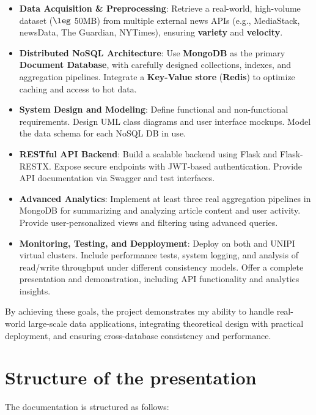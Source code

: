 \begin{itemize}
    \item \textbf{Data Acquisition \& Preprocessing}: Retrieve a real-world, high-volume dataset ($\leg$ 50MB) from multiple external news APIs (e.g., MediaStack, newsData, The Guardian, NYTimes), ensuring \textbf{variety} and \textbf{velocity}.
    \item \textbf{Distributed NoSQL Architecture}: Use \textbf{MongoDB} as the primary \textbf{Document Database}, with carefully designed collections, indexes, and aggregation pipelines.
    Integrate a \textbf{Key-Value store} (\textbf{Redis}) to optimize caching and access to hot data.
    \item \textbf{System Design and Modeling}: Define functional and non-functional requirements.
    Design UML class diagrams and user interface mockups.
    Model the data schema for each NoSQL DB in use.
    \item \textbf{RESTful API Backend}: Build a scalable backend using Flask and Flask-RESTX.
    Expose secure endpoints with JWT-based authentication.
    Provide API documentation via Swagger and test interfaces.
    \item \textbf{Advanced Analytics}: Implement at least three real aggregation pipelines in MongoDB for summarizing and analyzing article content and user activity.
    Provide user-personalized views and filtering using advanced queries.
    \item \textbf{Monitoring, Testing, and Depployment}: Deploy on both and UNIPI virtual clusters.
    Include performance tests, system logging, and analysis of read/write throughput under different consistency models.
    Offer a complete presentation and demonstration, including API functionality and analytics insights.
\end{itemize}

By achieving these goals, the project demonstrates my ability to handle real-world large-scale data applications,
integrating theoretical design with practical deployment, and ensuring cross-database consistency and performance.


\section{Structure of the presentation}\label{sec:structure-of-the-presentation}

The documentation is structured as follows:

